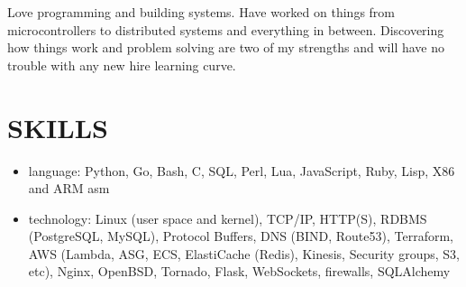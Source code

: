 \documentclass{res}
\begin{document}
\address{john@jjdev.com - (714) 895 6311 - Westminster, CA 92683}

\begin{resume}
    Love programming and building systems. Have worked on things
    from microcontrollers to distributed systems and everything in
    between. Discovering how things work and problem solving are two of my
    strengths and will have no trouble with any new hire learning curve.
\section{SKILLS}
\begin{itemize}
  \item
    language: Python, Go, Bash, C, SQL, Perl, Lua, JavaScript, Ruby, Lisp, X86 and ARM asm
  \item
    technology: Linux (user space and kernel), TCP/IP, HTTP(S),
    RDBMS (PostgreSQL, MySQL), Protocol Buffers, DNS (BIND, Route53),
    Terraform, AWS (Lambda, ASG, ECS, ElastiCache (Redis), Kinesis,
    Security groups, S3, etc), Nginx, OpenBSD, Tornado, Flask,
    WebSockets, firewalls, SQLAlchemy
  \end{itemize}

\end{resume}
\end{document}
